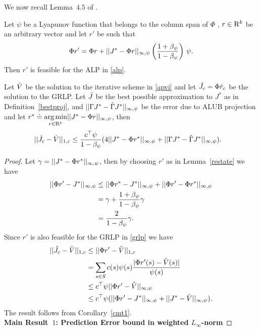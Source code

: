We now recall Lemma~$4.5$ of \cite{ALP}. 
\begin{lemma}\label{restate}
Let $\psi$ be a Lyapunov function that belongs to the column span of $\Phi$ , $r \in \mathrm{R}^k$ be an arbitrary vector and let $r'$ be such that
\begin{align}
\Phi r'=\Phi r+||J^*-\Phi r||_{\infty,\psi} \left(\frac{1+\beta_{\psi}}{1-\beta_{\psi}}\right)\, \psi.
\end{align}
Then $r'$ is feasible for the ALP in \eqref{alp}. 
\end{lemma}
\begin{theorem}\label{mt2mn}
Let $\hat{V}$ be the solution to the iterative scheme in \eqref{apvi} and let $\hat{J}_c=\Phi \hat{r}_c$ be the solution to the GRLP. Let $\bar{J}$ be the best possible approximation to $J^*$ as in Definition~\ref{bestproj}, and $||\Gamma J^* -\hat{\Gamma} J^*||_{\infty,\psi}$ be the error due to ALUB projection and let $r^*\doteq\underset{r\in \mathrm{R}^k}{\arg\min}||J^*-\Phi r||_{\infty,\psi}$, then
\begin{align}
||\hat{J}_c-\hat{V}||_{1,c}&\leq \frac{c^\top \psi}{1-\beta_\psi}(4||J^*-\Phi r^*||_{\infty,\psi}
+||\Gamma J^*-\hat{\Gamma} J^*||_{\infty,\psi}).
\end{align}
\end{theorem}
\begin{proof}
Let $\gamma=||J^*-\Phi r^*||_{\infty,\psi}$, then by choosing $r'$ as in Lemma~\ref{restate} we have
\begin{align}
||\Phi r'-J^*||_{\infty,\psi}&\leq ||\Phi r^*-J^*||_{\infty,\psi}+||\Phi r'-\Phi r^*||_{\infty,\psi}\nonumber\\
&=\gamma+\frac{1+\beta_\psi}{1-\beta_\psi}\gamma\nonumber\\
&=\frac{2}{1-\beta_\psi}\gamma.\nonumber
\end{align}
Since $r'$ is also feasible for the GRLP in \eqref{grlp} we have
\begin{align}
||\hat{J}_c-\hat{V}||_{1,c}&\leq||\Phi r'-\hat{V}||_{1,c}\nonumber\\
&=\sum_{s\in S}c(s)\psi(s)\frac{|\Phi r'(s)-\hat{V}(s)|}{\psi(s)}\nonumber\\
&\leq c^\top \psi ||\Phi r'-\hat{V}||_{\infty,\psi}\nonumber\\
&\leq c^\top \psi (||\Phi r'-J^*||_{\infty,\psi}+||J^*-\hat{V}||_{\infty,\psi}).
\end{align}
The result follows from Corollary~\ref{cmt1}.\\
\textbf{Main Result~$1$: Prediction Error bound in weighted $L_\infty$-norm}
\end{proof}
